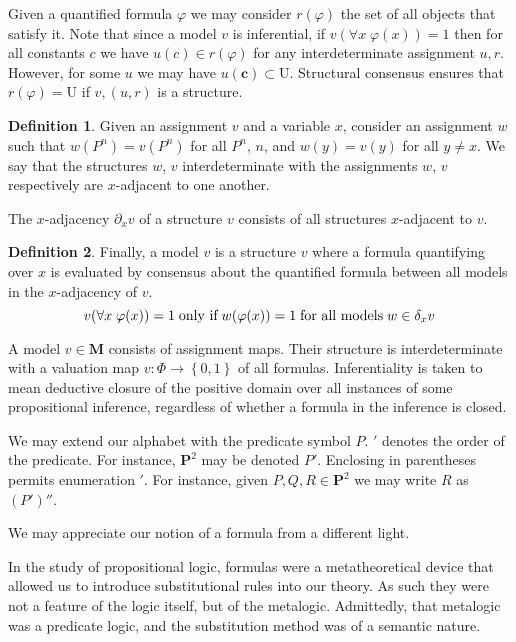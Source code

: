 \documentclass{amsbook}
\newcommand{\setsm}[1]{\left\{#1\right\}}
\newcommand{\univ}[1]{\mathord\forall#1\;}
\theoremstyle{definition}
\newtheorem{dfn}{Definition}[section]
\begin{document}
Given a quantified formula $\varphi$ we may consider $r(\varphi)$ the set of all objects that satisfy it. Note that since a model $v$ is inferential, if $v(\univ x \varphi(x)) = 1$ then for all constants $c$ we have $u(c) \in r(\varphi)$ for any interdeterminate assignment $u, r$. However, for some $u$ we may have $u(\mathbf c) \subset \mathrm U$. Structural consensus ensures that $r(\varphi) = \mathrm U$ if $v, (u, r)$ is a structure.

\begin{dfn}
    Given an assignment $v$ and a variable $x$, consider an assignment $w$ such that $w(P^n) = v(P^n)$ for all $P^n$, $n$, and $w(y) = v(y)$ for all $y \neq x$. We say that the structures $w$, $v$ interdeterminate with the assignments $w$, $v$ respectively are $x$-adjacent to one another.

    The $x$-adjacency $\partial_x v$ of a structure $v$ consists of all structures $x$-adjacent to $v$.
\end{dfn}

\begin{dfn}

    Finally, a model $v$ is a structure $v$ where a formula quantifying over $x$ is evaluated by consensus about the quantified formula between all models in the $x$-adjacency of $v$.
    $$v(\univ x \varphi(x)) = 1 \text{\;only if\;} w(\varphi(x)) = 1 \text{\;for all models\;} w \in \delta_x v$$
\end{dfn}

A model $v \in \mathbf M$ consists of assignment maps.
Their structure is interdeterminate with a valuation map $v: \Phi \longrightarrow \setsm{0,1}$ of all formulas.
Inferentiality is taken to mean deductive closure of the positive domain over all instances of some propositional inference, regardless of whether a formula in the inference is closed.

We may extend our alphabet with the predicate symbol $P$. $'$ denotes the order of the predicate. For instance, $\mathbf P^2$ may be denoted $P'$. Enclosing in parentheses permits enumeration $'$. For instance, given $P, Q, R \in \mathbf P^2$ we may write $R$ as $(P')''$.


We may appreciate our notion of a formula from a different light.

In the study of propositional logic, formulas were a metatheoretical device that allowed us to introduce substitutional rules into our theory. As such they were not a feature of the logic itself, but of the metalogic. Admittedly, that metalogic was a predicate logic, and the substitution method was of a semantic nature.
\end{document}
